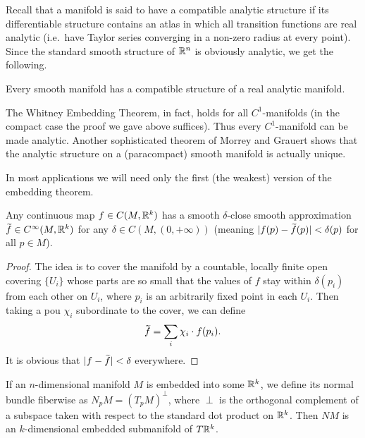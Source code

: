Recall that a manifold is said to have a compatible analytic structure if its differentiable structure contains an atlas in which all transition functions are real analytic (i.e.\ have Taylor series converging in a non-zero radius at every point). Since the standard smooth structure of $\mathbb{R}^n$ is obviously analytic, we get the following.

\begin{cor}
    Every smooth manifold has a compatible structure of a real analytic manifold.
\end{cor}
\begin{rem}
    The Whitney Embedding Theorem, in fact, holds for all $C^1$-manifolds (in the compact case the proof we gave above suffices). Thus every $C^1$-manifold can be made analytic. Another sophisticated theorem of Morrey and Grauert shows that the analytic structure on a (paracompact) smooth manifold is actually unique.
\end{rem}

In most applications we will need only the first (the weakest) version of the embedding theorem.


\begin{thm}\label{cor 6.22 Lee}
    Any continuous map $f\in C(M,\mathbb{R}^k)$ has a smooth $\delta$-close smooth approximation $\wt{f}\in C^\infty(M,\bbR^k)$ for any $\delta\in C(M,(0,+\infty))$ (meaning $|f(p)-\wt f(p)|<\delta(p)$ for all $p\in M$).
\end{thm}
\begin{proof}
    The idea is to cover the manifold by a countable, locally finite open covering $\{U_i\}$ whose parts are so small that the values of $f$ stay within $\delta(p_i)$ from each other on $U_i$, where $p_i$ is an arbitrarily fixed point in each $U_i$. Then taking a \gls{pou} $\chi_i$ subordinate to the cover, we can define
    \[
        \wt{f}=\sum_i \chi_i\cdot f(p_i).
    \]
    It is obvious that $|f-\wt{f}|<\delta$ everywhere.
\end{proof}

\begin{defn}
    If an $n$-dimensional manifold $M$ is embedded into some $\mathbb{R}^k$, we define its normal bundle fiberwise as $N_p M=(T_p M)^\perp$, where $\perp$ is the orthogonal complement of a subspace taken with respect to the standard dot product on $\mathbb{R}^k$. Then $NM$ is an $k$-dimensional embedded submanifold of $T\mathbb{R}^k$.
\end{defn}

